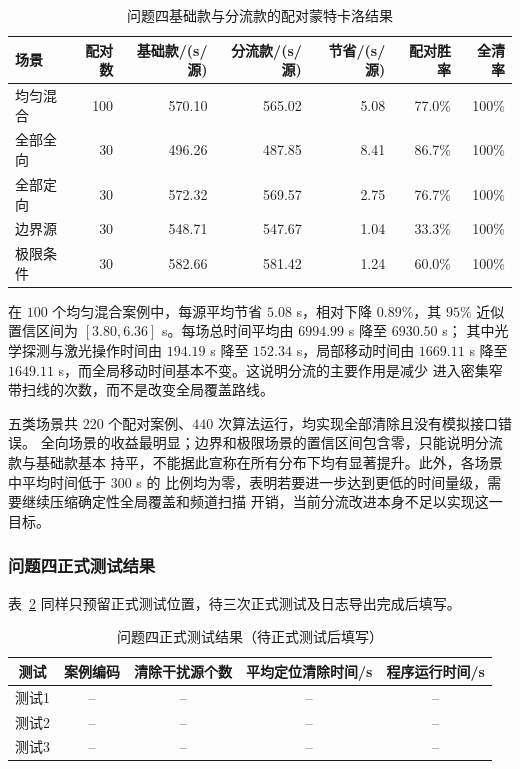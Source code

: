 \begin{table}[htbp]
\centering
\small
\caption{问题四基础款与分流款的配对蒙特卡洛结果}
\label{tab:p4-mc}
\begin{tabular}{lrrrrrr}
\toprule
场景 & 配对数 & 基础款/(s/源) & 分流款/(s/源) & 节省/(s/源) & 配对胜率 & 全清率 \\
\midrule
均匀混合 & 100 & 570.10 & 565.02 & 5.08 & 77.0\% & 100\% \\
全部全向 & 30  & 496.26 & 487.85 & 8.41 & 86.7\% & 100\% \\
全部定向 & 30  & 572.32 & 569.57 & 2.75 & 76.7\% & 100\% \\
边界源   & 30  & 548.71 & 547.67 & 1.04 & 33.3\% & 100\% \\
极限条件 & 30  & 582.66 & 581.42 & 1.24 & 60.0\% & 100\% \\
\bottomrule
\end{tabular}
\end{table}

在 $100$ 个均匀混合案例中，每源平均节省 $5.08$ s，相对下降 $0.89\%$，其 $95\%$
近似置信区间为 $[3.80,6.36]$ s。每场总时间平均由 $6994.99$ s 降至 $6930.50$ s；
其中光学探测与激光操作时间由 $194.19$ s 降至 $152.34$ s，局部移动时间由
$1669.11$ s 降至 $1649.11$ s，而全局移动时间基本不变。这说明分流的主要作用是减少
进入密集窄带扫线的次数，而不是改变全局覆盖路线。

五类场景共 $220$ 个配对案例、$440$ 次算法运行，均实现全部清除且没有模拟接口错误。
全向场景的收益最明显；边界和极限场景的置信区间包含零，只能说明分流款与基础款基本
持平，不能据此宣称在所有分布下均有显著提升。此外，各场景中平均时间低于 $300$ s 的
比例均为零，表明若要进一步达到更低的时间量级，需要继续压缩确定性全局覆盖和频道扫描
开销，当前分流改进本身不足以实现这一目标。


\subsubsection{问题四正式测试结果}

表~\ref{tab:p4-official} 同样只预留正式测试位置，待三次正式测试及日志导出完成后填写。

\begin{table}[htbp]
\centering
\caption{问题四正式测试结果（待正式测试后填写）}
\label{tab:p4-official}
\begin{tabular}{ccccc}
\toprule
测试 & 案例编码 & 清除干扰源个数 & 平均定位清除时间/s & 程序运行时间/s \\
\midrule
测试1 & -- & -- & -- & -- \\
测试2 & -- & -- & -- & -- \\
测试3 & -- & -- & -- & -- \\
\bottomrule
\end{tabular}
\end{table}

